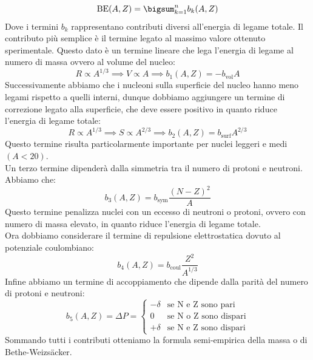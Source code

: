 \begin{equation}
 \text{BE}(A,Z) = \bigsum_{k=1}^{n} b_k(A,Z)
\end{equation}
Dove i termini $b_k$ rappresentano contributi diversi all'energia di legame totale. Il contributo più semplice è il termine legato al massimo valore ottenuto sperimentale. Questo dato è un termine lineare che lega l'energia di legame al numero di massa ovvero al volume del nucleo:
\begin{equation}
  R \propto A^{1/3} \implies V \propto A \implies b_1(A,Z) = -b_{\text{vol}} A
\end{equation}
Successivamente abbiamo che i nucleoni sulla superficie del nucleo hanno meno legami rispetto a quelli interni, dunque dobbiamo aggiungere un termine di correzione legato alla superficie, che deve essere positivo in quanto riduce l'energia di legame totale:
\begin{equation}
  R \propto A^{1/3} \implies S \propto A^{2/3} \implies b_2(A,Z) = b_{\text{surf}} A^{2/3}
\end{equation}
Questo termine risulta particolarmente importante per nuclei leggeri e medi $(A < 20)$.\\
Un terzo termine dipenderà dalla simmetria tra il numero di protoni e neutroni. Abbiamo che:
\begin{equation}
 b_3(A,Z) = b_{\text{sym}} \dfrac{(N-Z)^2}{A}
\end{equation}
Questo termine penalizza nuclei con un eccesso di neutroni o protoni, ovvero con numero di massa elevato, in quanto riduce l'energia di legame totale.\\
Ora dobbiamo considerare il termine di repulsione elettrostatica dovuto al potenziale coulombiano:
\begin{equation}
 b_4(A,Z) = b_{\text{coul}} \dfrac{Z^2}{A^{1/3}}
\end{equation}
Infine abbiamo un termine di accoppiamento che dipende dalla parità del numero di protoni e neutroni:
\begin{equation}
 b_5(A,Z) = \Delta P =
 \begin{cases}
  -\delta & \text{se N e Z sono pari}\\
  0 & \text{se N o Z sono dispari}\\
  +\delta & \text{se N e Z sono dispari}
 \end{cases}
\end{equation}
Sommando tutti i contributi otteniamo la formula semi-empirica della massa o di Bethe-Weizsäcker.
